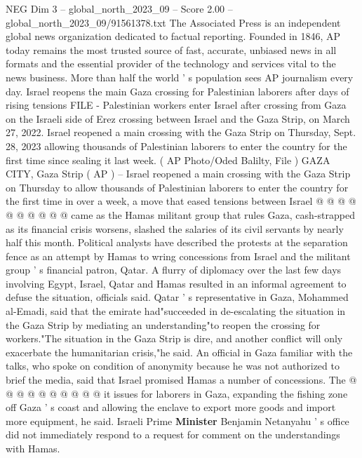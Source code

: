 \begin{textsample}{NEG Dim 3 – global\_north\_2023\_09 – Score 2.00 – global\_north\_2023\_09/91561378.txt}  \label{ex:f3_neg_409}
The Associated Press is an independent global news organization dedicated to factual reporting.
Founded in 1846, AP today remains the most trusted source of fast, accurate, unbiased news in all formats and the essential provider of the technology and services vital to the news business.
More than half the world ' s population sees AP journalism every day.
Israel reopens the main Gaza crossing for Palestinian laborers after days of rising tensions FILE - Palestinian workers enter Israel after crossing from Gaza on the Israeli side of Erez crossing between Israel and the Gaza Strip, on March 27, 2022.
Israel reopened a main crossing with the Gaza Strip on Thursday, Sept. 28, 2023 allowing thousands of Palestinian laborers to enter the country for the first time since sealing it last week. ( AP Photo/Oded Balilty, File ) GAZA CITY, Gaza Strip ( AP ) -- Israel reopened a main crossing with the Gaza Strip on Thursday to allow thousands of Palestinian laborers to enter the country for the first time in over a week, a move that eased tensions between Israel @ @ @ @ @ @ @ @ @ @ came as the Hamas militant group that rules Gaza, cash-strapped as its financial crisis worsens, slashed the salaries of its civil servants by nearly half this month.
Political analysts have described the protests at the separation fence as an attempt by Hamas to wring concessions from Israel and the militant group ' s financial patron, Qatar.
A flurry of diplomacy over the last few days involving Egypt, Israel, Qatar and Hamas resulted in an informal agreement to defuse the situation, officials said.
Qatar ' s representative in Gaza, Mohammed al-Emadi, said that the emirate had"succeeded in de-escalating the situation in the Gaza Strip by mediating an understanding"to reopen the crossing for workers."The situation in the Gaza Strip is dire, and another conflict will only exacerbate the humanitarian crisis,"he said.
An official in Gaza familiar with the talks, who spoke on condition of anonymity because he was not authorized to brief the media, said that Israel promised Hamas a number of concessions.
The @ @ @ @ @ @ @ @ @ @ it issues for laborers in Gaza, expanding the fishing zone off Gaza ' s coast and allowing the enclave to export more goods and import more equipment, he said.
Israeli Prime \textbf{Minister} Benjamin Netanyahu ' s office did not immediately respond to a request for comment on the understandings with Hamas.

\end{textsample}
